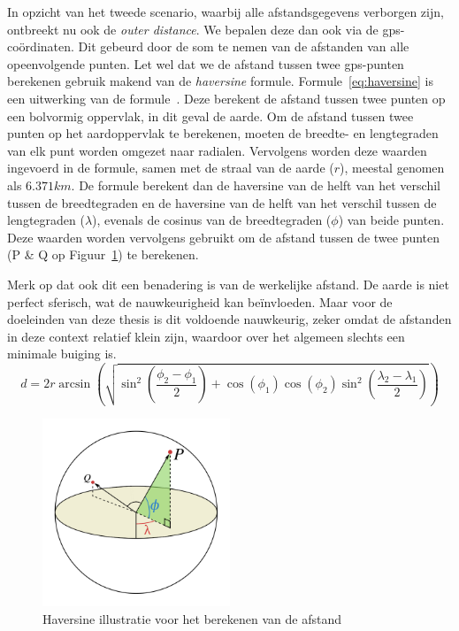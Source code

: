 In opzicht van het tweede scenario, waarbij alle afstandsgegevens verborgen
zijn, ontbreekt nu ook de \textit{outer distance}. We bepalen deze dan ook via
de \ac{gps}-coördinaten. Dit gebeurd door de som te nemen van de afstanden van
alle opeenvolgende punten. Let wel dat we de afstand tussen twee
\ac{gps}-punten berekenen gebruik makend van de \textit{haversine} formule.
Formule~\ref{eq:haversine} is een uitwerking van de
formule~\cite{sheppard1922practical}. Deze berekent de afstand tussen twee
punten op een bolvormig oppervlak, in dit geval de aarde. Om de afstand tussen
twee punten op het aardoppervlak te berekenen, moeten de breedte- en
lengtegraden van elk punt worden omgezet naar radialen. Vervolgens worden deze
waarden ingevoerd in de formule, samen met de straal van de aarde ($r$),
meestal genomen als $6.371 km$. De formule berekent dan de haversine van de
helft van het verschil tussen de breedtegraden en de haversine van de helft van
het verschil tussen de lengtegraden ($\lambda$), evenals de cosinus van de
breedtegraden ($\phi$) van beide punten. Deze waarden worden vervolgens
gebruikt om de afstand tussen de twee punten (P \& Q op
Figuur~\ref{fig:haversine}) te berekenen.

Merk op dat ook dit een benadering is van de werkelijke afstand. De aarde is
niet perfect sferisch, wat de nauwkeurigheid kan beïnvloeden. Maar voor de
doeleinden van deze thesis is dit voldoende nauwkeurig, zeker omdat de
afstanden in deze context relatief klein zijn, waardoor over het algemeen
slechts een minimale buiging is.
\begin{equation}\label{eq:haversine}
    d = 2r \arcsin\left(\sqrt{\sin^2\left(\frac{\phi_2-\phi_1}{2}\right)+\cos(\phi_1)\cos(\phi_2)\sin^2\left(\frac{\lambda_2-\lambda_1}{2}\right)}\right)
\end{equation}
\begin{figure}[h]
    \centering
    \includegraphics[width=0.5\textwidth]{fig/haversine.png}
    \caption{Haversine illustratie voor het berekenen van de afstand~\cite{Distance97:online}}\label{fig:haversine}
\end{figure}

